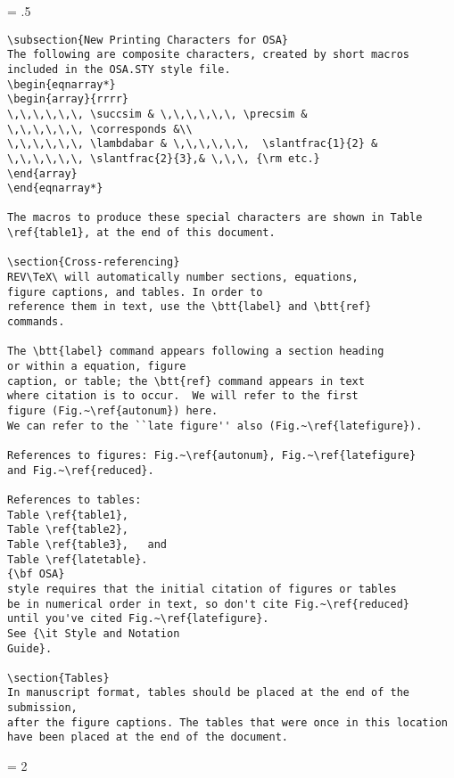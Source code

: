 \newpage
\baselineskip = .5\baselineskip  %
\begin{verbatim}
\subsection{New Printing Characters for OSA}
The following are composite characters, created by short macros
included in the OSA.STY style file.
\begin{eqnarray*}
\begin{array}{rrrr}
\,\,\,\,\,\, \succsim & \,\,\,\,\,\, \precsim &
\,\,\,\,\,\, \corresponds &\\
\,\,\,\,\,\, \lambdabar & \,\,\,\,\,\,  \slantfrac{1}{2} &
\,\,\,\,\,\, \slantfrac{2}{3},& \,\,\, {\rm etc.}
\end{array}
\end{eqnarray*}

The macros to produce these special characters are shown in Table
\ref{table1}, at the end of this document.

\section{Cross-referencing}
REV\TeX\ will automatically number sections, equations,
figure captions, and tables. In order to
reference them in text, use the \btt{label} and \btt{ref}
commands.

The \btt{label} command appears following a section heading
or within a equation, figure
caption, or table; the \btt{ref} command appears in text
where citation is to occur.  We will refer to the first
figure (Fig.~\ref{autonum}) here.
We can refer to the ``late figure'' also (Fig.~\ref{latefigure}).

References to figures: Fig.~\ref{autonum}, Fig.~\ref{latefigure}
and Fig.~\ref{reduced}.

References to tables:
Table \ref{table1},
Table \ref{table2},
Table \ref{table3},   and
Table \ref{latetable}.
{\bf OSA}
style requires that the initial citation of figures or tables
be in numerical order in text, so don't cite Fig.~\ref{reduced}
until you've cited Fig.~\ref{latefigure}.
See {\it Style and Notation
Guide}.

\section{Tables}
In manuscript format, tables should be placed at the end of the submission,
after the figure captions. The tables that were once in this location
have been placed at the end of the document.

\end{verbatim} \newpage
\baselineskip = 2\baselineskip  %


